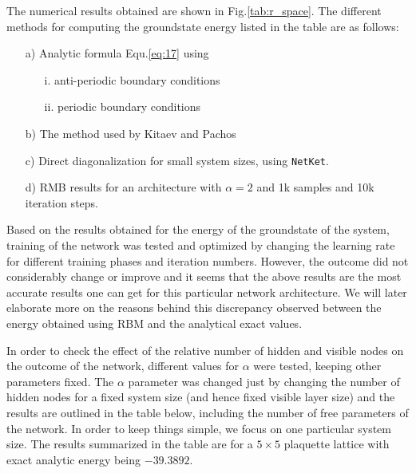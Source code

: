 \documentclass{article}
\begin{document}
The numerical results obtained are shown in Fig.\hspace{0.2mm}\ref{tab:r_space}. The different methods for computing the groundstate energy listed in the table are as follows:
\begin{enumerate}
	\item[a)] Analytic formula Equ.\hspace{0.2mm}\ref{eq:17} using
	\begin{itemize}
		\item[i.] anti-periodic boundary conditions
		\item[ii.] periodic boundary conditions
	\end{itemize}
	\item[b)] The method used by Kitaev and Pachos \cite{Kitaev_2003,pachos_2012}
	\item[c)] Direct diagonalization for small system sizes, using \texttt{NetKet}.
	\item[d)] RMB results for an architecture with $\alpha=2$ and 1k samples and 10k iteration steps.
\end{enumerate}

Based on the results obtained for the energy of the groundstate of the system, training of the network was tested and optimized by changing the learning rate for different training phases and iteration numbers. However, the outcome did not considerably change or improve and it seems that the above results are the most accurate results one can get for this particular network architecture. We will later elaborate more on the reasons behind this discrepancy observed between the energy obtained using RBM and the analytical exact values.

In order to check the effect of the relative number of hidden and visible nodes on the outcome of the network, different values for $\alpha$ were tested, keeping other parameters fixed. The $\alpha$ parameter was changed just by changing the number of hidden nodes for a fixed system size (and hence fixed visible layer size) and the results are outlined in the table below, including the number of free parameters of the network. In order to keep things simple, we focus on one particular system size. The results summarized in the table are for a $5 \times 5$ plaquette lattice with exact analytic energy being $-39.3892$.
\end{document}
